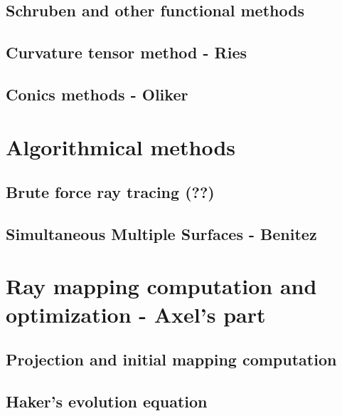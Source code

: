 \subsection{Schruben and other functional methods}

\subsection{Curvature tensor method - Ries}

\subsection{Conics methods - Oliker}

\section{Algorithmical methods}
\subsection{Brute force ray tracing (??) }
\subsection{Simultaneous Multiple Surfaces - Benitez}


\section{Ray mapping computation and optimization - Axel's part}
\subsection{Projection and initial mapping computation}

\subsection{Haker's evolution equation}




